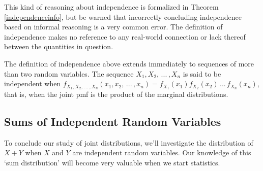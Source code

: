 \par
This kind of reasoning about independence is formalized in Theorem \ref{independenceinfo}, but be warned that incorrectly concluding independence based on informal reasoning is a very common error. The definition of independence makes no reference to any real-world connection or lack thereof between the quantities in question.
\par
The definition of independence above extends immediately to sequences of more than two random variables. The sequence $X_1, X_2,\,...\,, X_n$ is said to be independent when $f_{X_1, X_2, \,...\, , X_n}(x_1, x_2, \,...\, , x_n) = f_{X_1}(x_1)f_{X_2}(x_2) \,...\, f_{X_n}(x_n)$, that is, when the joint pmf is the product of the marginal distributions.

\subsection*{Sums of Independent Random Variables}

To conclude our study of joint distributions, we'll investigate the distribution of $X+Y$ when $X$ and $Y$ are independent random variables. Our knowledge of this `sum distribution' will become very valuable when we start statistics.
\par

